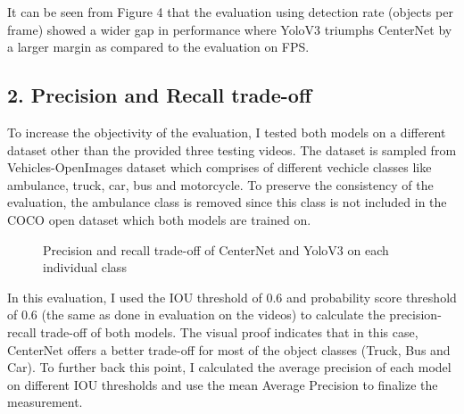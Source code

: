 \documentclass[12pt]{article}
\begin{document}
It can be seen from Figure 4 that the evaluation using detection rate (objects per frame) showed a wider gap in performance where YoloV3 triumphs CenterNet by a larger margin as compared to the evaluation on FPS. 

\subsection*{2. Precision and Recall trade-off}
To increase the objectivity of the evaluation, I tested both models on a different dataset other than the provided three testing videos. The dataset is sampled from Vehicles-OpenImages dataset which comprises of different vechicle classes like ambulance, truck, car, bus and motorcycle. To preserve the consistency of the evaluation, the ambulance class is removed since this class is not included in the COCO open dataset which both models are trained on.

\begin{figure}[H]%
    \centering
    \qquad
    \caption{Precision and recall trade-off of CenterNet and YoloV3 on each individual class}%
    \label{fig:example}%
\end{figure}

In this evaluation, I used the IOU threshold of 0.6 and probability score threshold of 0.6 (the same as done in evaluation on the videos) to calculate the precision-recall trade-off of both models. The visual proof indicates that in this case, CenterNet offers a better trade-off for most of the object classes (Truck, Bus and Car). To further back this point, I calculated the average precision of each model on different IOU thresholds and use the mean Average Precision to finalize the measurement.\newline
\end{document}
